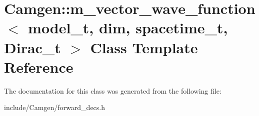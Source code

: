 \hypertarget{a00337}{}\section{Camgen\+:\+:m\+\_\+vector\+\_\+wave\+\_\+function$<$ model\+\_\+t, dim, spacetime\+\_\+t, Dirac\+\_\+t $>$ Class Template Reference}
\label{a00337}


The documentation for this class was generated from the following file\+:\begin{DoxyCompactItemize}
\item 
include/\+Camgen/forward\+\_\+decs.\+h\end{DoxyCompactItemize}
